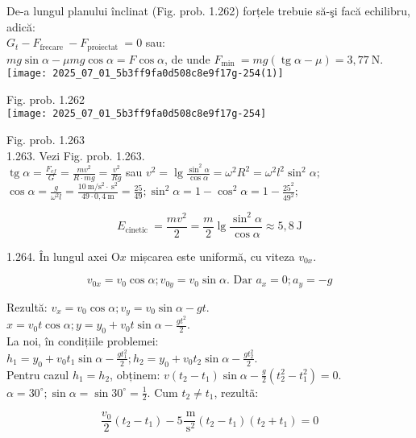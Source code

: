 De-a lungul planului înclinat (Fig. prob. 1.262) forțele trebuie să-şi facă echilibru, adică:\\
$G_{t}-F_{\text {frecare }}-F_{\text {proiectat }}=0$ sau:\\
$m g \sin \alpha-\mu m g \cos \alpha=F \cos \alpha$, de unde $F_{\text {min }}=m g(\operatorname{tg} \alpha-\mu)=3,77 \mathrm{~N}$.\\
\texttt{[image: 2025\_07\_01\_5b3ff9fa0d508c8e9f17g-254(1)]}

Fig. prob. 1.262\\
\texttt{[image: 2025\_07\_01\_5b3ff9fa0d508c8e9f17g-254]}

Fig. prob. 1.263\\
1.263. Vezi Fig. prob. 1.263.\\
$\operatorname{tg} \alpha=\frac{F_{c f}}{G}=\frac{m v^{2}}{R \cdot m g}=\frac{v^{2}}{R g}$ sau $v^{2}=\lg \frac{\sin ^{2} \alpha}{\cos \alpha}=\omega^{2} R^{2}=\omega^{2} l^{2} \sin ^{2} \alpha ;$\\
$\cos \alpha=\frac{g}{\omega^{2} l}=\frac{10 \mathrm{~m} / \mathrm{s}^{2} \cdot \mathrm{~s}^{2}}{49 \cdot 0,4 \mathrm{~m}}=\frac{25}{49} ; \sin ^{2} \alpha=1-\cos ^{2} \alpha=1-\frac{25^{2}}{49^{2}}$;

$$
E_{\text {cinetic }}=\frac{m v^{2}}{2}=\frac{m}{2} \lg \frac{\sin ^{2} \alpha}{\cos \alpha} \approx 5,8 \mathrm{~J}
$$

1.264. În lungul axei $\mathrm{O} x$ mișcarea este uniformă, cu viteza $v_{0 x}$.

$$
v_{0 x}=v_{0} \cos \alpha ; v_{0 y}=v_{0} \sin \alpha . \text { Dar } a_{x}=0 ; a_{y}=-g
$$

Rezultă: $v_{x}=v_{0} \cos \alpha ; v_{y}=v_{0} \sin \alpha-g t$.\\
$x=v_{0} t \cos \alpha ; y=y_{0}+v_{0} t \sin \alpha-\frac{g t^{2}}{2}$.\\
La noi, în condițiile problemei:\\
$h_{1}=y_{0}+v_{0} t_{1} \sin \alpha-\frac{g t_{1}^{2}}{2} ; h_{2}=y_{0}+v_{0} t_{2} \sin \alpha-\frac{g t_{2}^{2}}{2}$.\\
Pentru cazul $h_{1}=h_{2}$, obținem: $v\left(t_{2}-t_{1}\right) \sin \alpha-\frac{g}{2}\left(t_{2}^{2}-t_{1}^{2}\right)=0$.\\
$\alpha=30^{\circ} ; \sin \alpha=\sin 30^{\circ}=\frac{1}{2}$. Cum $t_{2} \neq t_{1}$, rezultã:

$$
\frac{v_{0}}{2}\left(t_{2}-t_{1}\right)-5 \frac{\mathrm{~m}}{\mathrm{~s}^{2}}\left(t_{2}-t_{1}\right)\left(t_{2}+t_{1}\right)=0
$$

